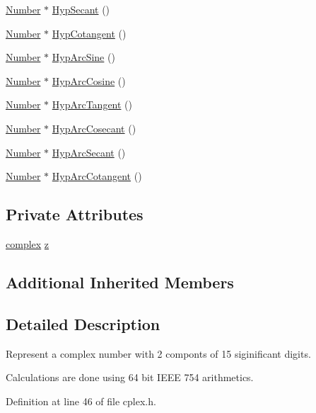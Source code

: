 \begin{DoxyCompactItemize}
\item 
\hyperlink{structNumber}{Number} $\ast$ \hyperlink{structComplexNumber_af3c80a4c100e00445f5e4c52be29c031}{Hyp\+Secant} ()
\item 
\hyperlink{structNumber}{Number} $\ast$ \hyperlink{structComplexNumber_aecf508c5b54725938ffe98f97088d4db}{Hyp\+Cotangent} ()
\item 
\hyperlink{structNumber}{Number} $\ast$ \hyperlink{structComplexNumber_a0081fb3057a6ab825ac0b3dbea62406b}{Hyp\+Arc\+Sine} ()
\item 
\hyperlink{structNumber}{Number} $\ast$ \hyperlink{structComplexNumber_a9d1b26167fb3e3c84e18b724bcfbb48a}{Hyp\+Arc\+Cosine} ()
\item 
\hyperlink{structNumber}{Number} $\ast$ \hyperlink{structComplexNumber_a9c1090310f2f9e656467625e0137c8dc}{Hyp\+Arc\+Tangent} ()
\item 
\hyperlink{structNumber}{Number} $\ast$ \hyperlink{structComplexNumber_af53cdbbf59f07f40118cf05a51cf3d0a}{Hyp\+Arc\+Cosecant} ()
\item 
\hyperlink{structNumber}{Number} $\ast$ \hyperlink{structComplexNumber_af0d9ceb661b6bf3052d3806c84ab6faf}{Hyp\+Arc\+Secant} ()
\item 
\hyperlink{structNumber}{Number} $\ast$ \hyperlink{structComplexNumber_acf624375cf09c48f5209ec3605ca01f6}{Hyp\+Arc\+Cotangent} ()
\end{DoxyCompactItemize}
\subsection*{Private Attributes}
\begin{DoxyCompactItemize}
\item 
\hyperlink{unioncomplex}{complex} \hyperlink{structComplexNumber_a5f72da71f4ce0d88076a391369239042}{z}
\end{DoxyCompactItemize}
\subsection*{Additional Inherited Members}


\subsection{Detailed Description}
Represent a complex number with 2 componts of 15 siginificant digits. 

Calculations are done using 64 bit I\+E\+EE 754 arithmetics. 

Definition at line 46 of file cplex.\+h.




